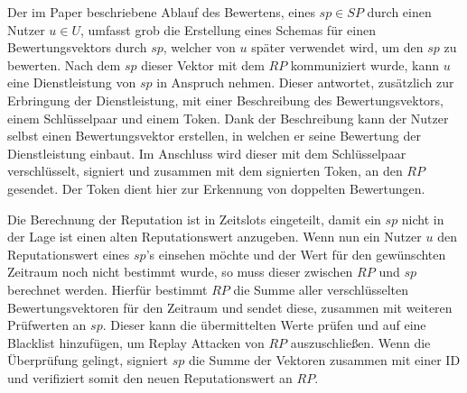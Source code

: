 \documentclass[11pt,a4paper]{scrreprt}
\begin{document}
Der im Paper beschriebene Ablauf des Bewertens, eines $sp \in SP$ durch einen Nutzer $u \in U$, umfasst grob die Erstellung eines Schemas für einen Bewertungsvektors durch $sp$, welcher von $u$ später verwendet wird, um den $sp$ zu bewerten. Nach dem $sp$ dieser Vektor mit dem $RP$ kommuniziert wurde, kann $u$ eine Dienstleistung von $sp$ in Anspruch nehmen. Dieser antwortet, zusätzlich zur Erbringung der Dienstleistung, mit einer Beschreibung des Bewertungsvektors, einem Schlüsselpaar und einem Token. Dank der Beschreibung kann der Nutzer selbst einen Bewertungsvektor erstellen, in welchen er seine Bewertung der Dienstleistung einbaut. Im Anschluss wird dieser mit dem Schlüsselpaar verschlüsselt, signiert und zusammen mit dem signierten Token, an den $RP$ gesendet. Der Token dient hier zur Erkennung von doppelten Bewertungen. 

Die Berechnung der Reputation ist in Zeitslots eingeteilt, damit ein $sp$ nicht in der Lage ist einen alten Reputationswert anzugeben. Wenn nun ein Nutzer $u$ den Reputationswert eines $sp$'s einsehen möchte und der Wert für den gewünschten Zeitraum noch nicht bestimmt wurde, so muss dieser zwischen $RP$ und $sp$ berechnet werden. Hierfür bestimmt $RP$ die Summe aller verschlüsselten Bewertungsvektoren für den Zeitraum und sendet diese, zusammen mit weiteren Prüfwerten an $sp$. Dieser kann die übermittelten Werte prüfen und auf eine Blacklist hinzufügen, um Replay Attacken von $RP$ auszuschließen. Wenn die Überprüfung gelingt, signiert $sp$ die Summe der Vektoren zusammen mit einer ID und verifiziert somit den neuen Reputationswert an $RP$. 
\end{document}
